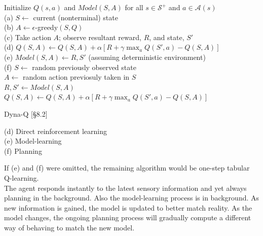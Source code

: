 \documentclass[10pt,landscape]{article}
\begin{document}
\begin{multicols}{3}
\begin{algorithm}[H]
 Initialize $Q(s,a)$ and $Model(S,A)$ for all $s \in \mathcal{S}^+$ and $a \in \mathcal{A}(s)$\\
{
	(a) $S \leftarrow$ current (nonterminal) state \\
	(b) $A \leftarrow \epsilon$-greedy$(S, Q)$ \\
	(c) Take action $A$; observe resultant reward, $R$, and state, $S'$ \\
	(d) $Q(S, A) \leftarrow Q(S, A) + \alpha \left[R + \gamma \max_a Q(S', a) - Q(S, A)  \right]$ \\
	(e) $Model(S, A) \leftarrow R, S'$ (assuming deterministic environment) \\
	(f) 
	{
		$S \leftarrow$ random previously observed state \\
		$A \leftarrow$ random action previosuly taken in $S$\\
		$R, S' \leftarrow Model(S, A)$ \\
		$Q(S, A) \leftarrow Q(S, A) + \alpha \left[R + \gamma \max_a Q(S', a) - Q(S, A)  \right]$ \\
	}
 }
\caption{Dyna-Q [§8.2]}
\end{algorithm}

(d) Direct reinforcement learning\\
(e) Model-learning\\
(f) Planning\\

\vfill\null
\columnbreak

If (e) and (f) were omitted, the remaining algorithm would be one-step tabular Q-learning.\\

The agent responds instantly to the latest sensory information and yet always planning in the background. Also the model-learning process is in background. As new information is gained, the model is updated to better match reality. As the model changes, the ongoing planning process will gradually compute a different way of behaving to match the new model.\\


\end{multicols}
\end{document}
